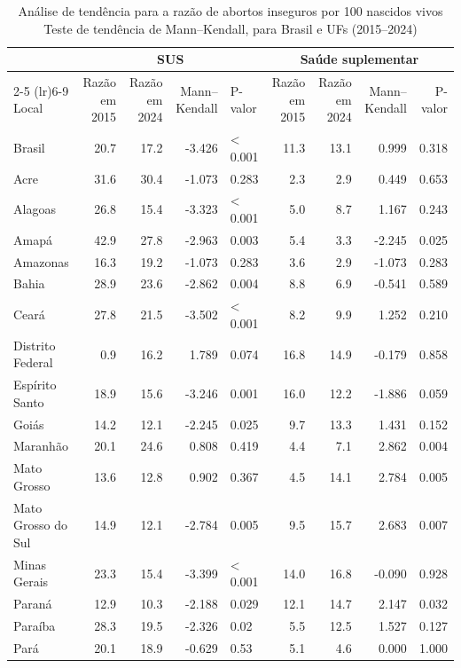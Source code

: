 \begin{table}[!t]
\caption*{
{\large Análise de tendência para a razão de abortos inseguros por 100 nascidos vivos} \\ 
{\small Teste de tendência de Mann–Kendall, para Brasil e UFs (2015–2024)}
} 
\fontsize{12.0pt}{14.4pt}\selectfont
\begin{tabular*}{\linewidth}{@{\extracolsep{\fill}}lrrrlrrrr}
\toprule
 & \multicolumn{4}{c}{SUS} & \multicolumn{4}{c}{Saúde suplementar} \\ 
\cmidrule(lr){2-5} \cmidrule(lr){6-9}
Local & Razão em 2015 & Razão em 2024 & Mann–Kendall & P-valor & Razão em 2015 & Razão em 2024 & Mann–Kendall & P-valor \\ 
\midrule\addlinespace[2.5pt]
Brasil & 20.7 & 17.2 & -3.426 & < 0.001 & 11.3 & 13.1 & 0.999 & 0.318 \\ 
Acre & 31.6 & 30.4 & -1.073 & 0.283 & 2.3 & 2.9 & 0.449 & 0.653 \\ 
Alagoas & 26.8 & 15.4 & -3.323 & < 0.001 & 5.0 & 8.7 & 1.167 & 0.243 \\ 
Amapá & 42.9 & 27.8 & -2.963 & 0.003 & 5.4 & 3.3 & -2.245 & 0.025 \\ 
Amazonas & 16.3 & 19.2 & -1.073 & 0.283 & 3.6 & 2.9 & -1.073 & 0.283 \\ 
Bahia & 28.9 & 23.6 & -2.862 & 0.004 & 8.8 & 6.9 & -0.541 & 0.589 \\ 
Ceará & 27.8 & 21.5 & -3.502 & < 0.001 & 8.2 & 9.9 & 1.252 & 0.210 \\ 
Distrito Federal & 0.9 & 16.2 & 1.789 & 0.074 & 16.8 & 14.9 & -0.179 & 0.858 \\ 
Espírito Santo & 18.9 & 15.6 & -3.246 & 0.001 & 16.0 & 12.2 & -1.886 & 0.059 \\ 
Goiás & 14.2 & 12.1 & -2.245 & 0.025 & 9.7 & 13.3 & 1.431 & 0.152 \\ 
Maranhão & 20.1 & 24.6 & 0.808 & 0.419 & 4.4 & 7.1 & 2.862 & 0.004 \\ 
Mato Grosso & 13.6 & 12.8 & 0.902 & 0.367 & 4.5 & 14.1 & 2.784 & 0.005 \\ 
Mato Grosso do Sul & 14.9 & 12.1 & -2.784 & 0.005 & 9.5 & 15.7 & 2.683 & 0.007 \\ 
Minas Gerais & 23.3 & 15.4 & -3.399 & < 0.001 & 14.0 & 16.8 & -0.090 & 0.928 \\ 
Paraná & 12.9 & 10.3 & -2.188 & 0.029 & 12.1 & 14.7 & 2.147 & 0.032 \\ 
Paraíba & 28.3 & 19.5 & -2.326 & 0.02 & 5.5 & 12.5 & 1.527 & 0.127 \\ 
Pará & 20.1 & 18.9 & -0.629 & 0.53 & 5.1 & 4.6 & 0.000 & 1.000 \\ 

\end{tabular*}
\end{table}

